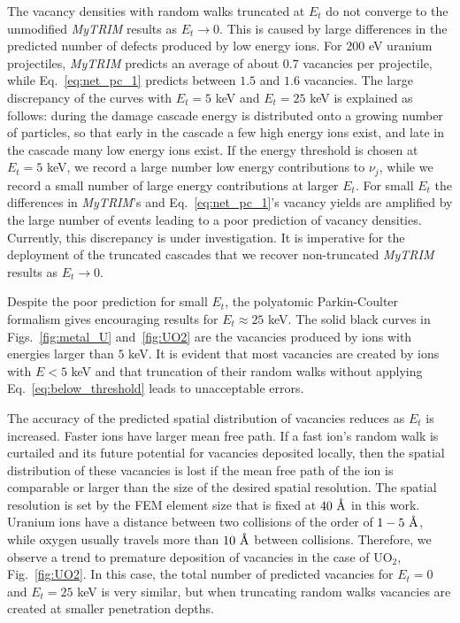 \documentclass[letterpaper]{mandc2019}
\newcommand{\angstrom}{\text{\normalfont\AA}}
\begin{document}
The vacancy densities with random walks truncated at $E_t$ do not converge to the unmodified \textit{MyTRIM} results as $E_t \rightarrow 0$. This is caused by large differences in the predicted number of defects produced by low energy ions. For $200$ eV uranium projectiles, \textit{MyTRIM} predicts an average of about $0.7$ vacancies per projectile, while Eq.~\ref{eq:net_pc_1} predicts between $1.5$ and $1.6$ vacancies. The large discrepancy of the curves with $E_t = 5$ keV and $E_t=25$ keV is explained as follows: during the damage cascade energy is distributed onto a growing number of particles, so that early in the cascade a few high energy ions exist, and late in the cascade many low energy ions exist. If the energy threshold is chosen at $E_t=5$ keV, we record a large number low energy contributions to $\nu_j$, while we record a small number of large energy contributions at larger $E_t$. For small $E_t$ the differences in \textit{MyTRIM}'s and Eq.~\ref{eq:net_pc_1}'s vacancy yields are amplified by the large number of events leading to a poor prediction of vacancy densities. Currently, this discrepancy is under investigation. It is imperative for the deployment of the truncated cascades that we recover non-truncated \textit{MyTRIM} results as $E_t \rightarrow 0$.

Despite the poor prediction for small $E_t$, the polyatomic Parkin-Coulter formalism gives encouraging results for $E_t\approx 25$ keV. The solid black curves in Figs.~\ref{fig:metal_U} and~\ref{fig:UO2} are the vacancies produced by ions with energies larger than $5$ keV. It is evident that most vacancies are created by ions with $E < 5$ keV and that truncation of their random walks without applying Eq.~\ref{eq:below_threshold} leads to unacceptable errors.

The accuracy of the predicted spatial distribution of vacancies reduces as $E_t$ is increased. Faster ions have larger mean free path. If a fast ion's random walk is curtailed and its future potential for vacancies deposited locally, then the spatial distribution of these vacancies is lost if the mean free path of the ion is comparable or larger than the size of the desired spatial resolution. The spatial resolution is set by the FEM element size that is fixed at $40~\angstrom$ in this work. Uranium ions have a distance between two collisions of the order of $1-5~\angstrom$, while oxygen usually travels more than $10~\angstrom$ between collisions. Therefore, we observe a trend to premature deposition of vacancies in the case of UO$_2$, Fig.~\ref{fig:UO2}. In this case, the total number of predicted vacancies for $E_t=0$ and $E_t=25$ keV is very similar, but when truncating random walks vacancies are created at smaller penetration depths.   
\end{document}
